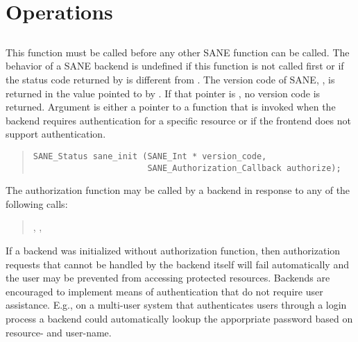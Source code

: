 \documentclass[11pt,DVIps]{report}
\begin{document}
\section{Operations}

\subsection{}

This function must be called before any other SANE function can be called.
The behavior of a SANE backend is undefined if this function is not called
first or if the status code returned by  is different from
.  The version code of SANE,
, is returned in the value pointed to by .
If that pointer is , no version code is returned.
Argument  is either a pointer to a function that is invoked
when the backend requires authentication for a specific resource or 
if the frontend does not support authentication.
\begin{quote}
\begin{verbatim}
SANE_Status sane_init (SANE_Int * version_code,
                       SANE_Authorization_Callback authorize);
\end{verbatim}
\end{quote}

The authorization function may be called by a backend in response to
any of the following calls:
\begin{quote}
  , , 
\end{quote}
If a backend was initialized without authorization function, then
authorization requests that cannot be handled by the backend itself
will fail automatically and the user may be prevented from accessing
protected resources.  Backends are encouraged to implement means of
authentication that do not require user assistance.  E.g., on a
multi-user system that authenticates users through a login process a
backend could automatically lookup the apporpriate password based on
resource- and user-name.
\end{document}
